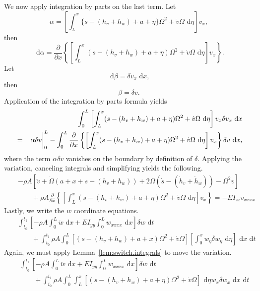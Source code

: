 We now apply integration by parts on the last term. Let 
\begin{equation}
\alpha = \left[\int_L^x\lbrace s-(h_v+h_w)+a+\eta\rbrace\Omega^2+\dot v\Omega\text{ d}\eta\right] v_{x},
\end{equation}
then
\begin{equation}
\text{ d}\alpha = \frac{\partial }{\partial x}\left\lbrace\left[\int_L^x( s-(h_v+h_w)+a+\eta)\Omega^2+\dot v\Omega\text{ d}\eta\right] v_{x}\right\rbrace.
\end{equation}
Let 
\begin{equation}
\text{ d}\beta = \delta v_x\text{ d}x,
\end{equation}
then
\begin{equation}
\beta = \delta v.
\end{equation}
Application of the integration by parts formula yields
\begin{eqnarray}
& &\int_0^L \left[\int_L^x(s-(h_v+h_w)+a+\eta)\Omega^2+\dot v\Omega\text{ d}\eta\right] v_{x}\delta v_x\text{ d}x \\
&=& \left.\vphantom{\frac{0}{0}}\alpha\delta v\right|_0^L-\int_0^L\frac{\partial }{\partial x}\left\lbrace\left[\int_L^x( s-(h_v+h_w)+a+\eta)\Omega^2+\dot v\Omega\text{ d}\eta\right] v_{x}\right\rbrace\delta v\text{ d}x,\nonumber
\end{eqnarray}
where the term $\alpha\delta v$ vanishes on the boundary by definition of $\delta$.
Applying the variation, canceling integrals and simplifying yields the following.
\begin{eqnarray}
& & -\rho A [\ddot v + \dot \Omega (a+x+s-(h_v+h_w))+2\Omega(\dot s - (\dot h_v+\dot h_w))-\Omega^2v] \\ 
& & \qquad +\rho A \frac{\partial }{\partial x}\left\lbrace\left[\int_L^x( s-(h_v+h_w)+a+\eta)\Omega^2+\dot v\Omega\text{ d}\eta\right] v_{x}\right\rbrace = -EI_{zz}v_{xxxx}\nonumber
\end{eqnarray}
Lastly, we write the $w$ coordinate equations.
\begin{eqnarray}
& & \int_{t_0}^{t_1}\left[-\rho A\int_0^L \ddot w\text{ d}x+EI_{yy}\int_0^L w_{xxxx}\text{ d}x\right]\delta w\text{ d}t \\
& & \qquad +\int_{t_0}^{t_1}\rho A\int_0^L  [( s-(h_v+h_w)+a+x)\Omega^2+\dot v\Omega]\left[\int_0^xw_{\eta}\delta w_{\eta}\text{ d}\eta\right]\text{ d}x\text{ d}t\nonumber 
\end{eqnarray}
Again, we must apply Lemma~\ref{lem:switch.integrals} to move the variation.
\begin{eqnarray}
& & \int_{t_0}^{t_1}\left[-\rho A\int_0^L \ddot w\text{ d}x+EI_{yy}\int_0^L w_{xxxx}\text{ d}x\right]\delta w\text{ d}t \\
& & \qquad +\int_{t_0}^{t_1}\rho A\int_0^L \int_L^x[(s-(h_v+h_w)+a+\eta)\Omega^2+\dot v\Omega]\text{ d}\eta w_{x}\delta w_x\text{ d}x\text{ d}t\nonumber 
\end{eqnarray}
